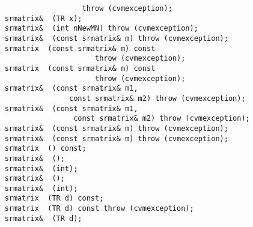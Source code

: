 \verb"                      throw (cvmexception);"\\
\verb"    srmatrix& "\verb" (TR x);"\\
\verb"    srmatrix& "\verb" (int nNewMN) throw (cvmexception);"\\
\verb"    srmatrix& "\verb" (const srmatrix& m) throw (cvmexception);"\\
\verb"    srmatrix "\verb" (const srmatrix& m) const"\\
\verb"                         throw (cvmexception);"\\
\verb"    srmatrix "\verb" (const srmatrix& m) const"\\
\verb"                         throw (cvmexception);"\\
\verb"    srmatrix& "\verb" (const srmatrix& m1,"\\
\verb"                   const srmatrix& m2) throw (cvmexception);"\\
\verb"    srmatrix& "\verb" (const srmatrix& m1,"\\
\verb"                    const srmatrix& m2) throw (cvmexception);"\\
\verb"    srmatrix& "\verb" (const srmatrix& m) throw (cvmexception);"\\
\verb"    srmatrix& "\verb" (const srmatrix& m) throw (cvmexception);"\\
\verb"    srmatrix "\verb" () const;"\\
\verb"    srmatrix& "\verb" ();"\\
\verb"    srmatrix& "\verb" (int);"\\
\verb"    srmatrix& "\verb" ();"\\
\verb"    srmatrix& "\verb" (int);"\\
\verb"    srmatrix "\verb" (TR d) const;"\\
\verb"    srmatrix "\verb" (TR d) const throw (cvmexception);"\\
\verb"    srmatrix& "\verb" (TR d);"\\

